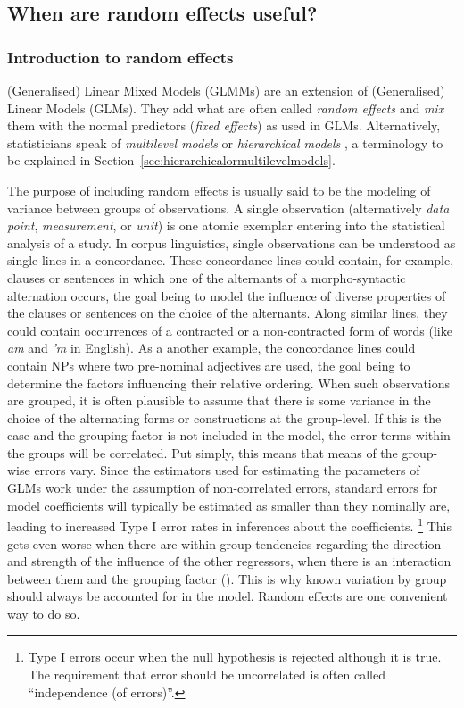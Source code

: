 \subsection{When are random effects useful?}
\label{sec:whenrandomeffectsareuseful}

\subsubsection{Introduction to random effects}
\label{sec:introductiontorandomeffects}

(Generalised) Linear Mixed Models (GLMMs) are an extension of (Generalised) Linear Models (GLMs).
They add what are often called \textit{random effects} and \textit{mix} them with the normal predictors (\textit{fixed effects}) as used in GLMs.
Alternatively, statisticians speak of \textit{multilevel models} or \textit{hierarchical models} \citep{GelmanHill2006}, a terminology to be explained in Section~\ref{sec:hierarchicalormultilevelmodels}.

The purpose of including random effects is usually said to be the modeling of variance between groups of observations.
A single observation (alternatively \textit{data point}, \textit{measurement}, or \textit{unit}) is one atomic exemplar entering into the statistical analysis of a study.
In corpus linguistics, single observations can be understood as single lines in a concordance.
These concordance lines could contain, for example, clauses or sentences in which one of the alternants of a morpho-syntactic alternation occurs, the goal being to model the influence of diverse properties of the clauses or sentences on the choice of the alternants.
Along similar lines, they could contain occurrences of a contracted or a non-contracted form of words (like \textit{am} and \textit{'m} in English).
As a another example, the concordance lines could contain NPs where two pre-nominal adjectives are used, the goal being to determine the factors influencing their relative ordering.
When such observations are grouped, it is often plausible to assume that there is some variance in the choice of the alternating forms or constructions at the group-level.
If this is the case and the grouping factor is not included in the model, the error terms within the groups will be correlated.
Put simply, this means that means of the group-wise errors vary.
Since the estimators used for estimating the parameters of GLMs work under the assumption of non-correlated errors, standard errors for model coefficients will typically be estimated as smaller than they nominally are, leading to increased Type I error rates in inferences about the coefficients.%
\footnote{Type I errors occur when the null hypothesis is rejected although it is true.
The requirement that error should be uncorrelated is often called ``independence (of errors)''.}
This gets even worse when there are within-group tendencies regarding the direction and strength of the influence of the other regressors, \ie when there is an interaction between them and the grouping factor (\eg \citealt{SchielzethForstmeier2009}).
This is why known variation by group should always be accounted for in the model.
Random effects are one convenient way to do so.

